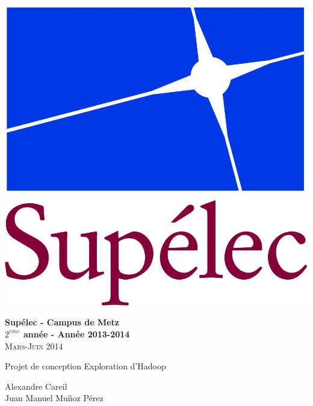 \begin{minipage}{1\textwidth}
  \centering 

  \begin{flushleft}
    \includegraphics[scale=0.3]{LogoSup.jpg}
    \newline

    \textbf{Supélec - Campus de Metz\\
      $2^{eme}$ année - Année 2013-2014}\\
    \textsc{Mars-Juin 2014}
  \end{flushleft}
  
  \vskip 5cm
  {\LARGE\textsc Projet de conception}
  \vskip 0.5cm
  {\LARGE\textsc Exploration d'Hadoop}
  \vskip 5cm

  \Large{Alexandre Careil \\
    Juan Manuel Mu\~noz Pérez}
\end{minipage}

